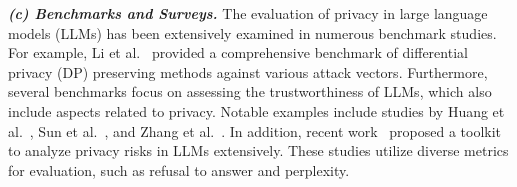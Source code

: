 \textbf{\textit{(c) Benchmarks and Surveys.}} The evaluation of privacy in large language models (LLMs) has been extensively examined in numerous benchmark studies. For example, Li et al.~\cite{Li2023PrivLMBenchAM} provided a comprehensive benchmark of differential privacy (DP) preserving methods against various attack vectors. Furthermore, several benchmarks focus on assessing the trustworthiness of LLMs, which also include aspects related to privacy. Notable examples include studies by Huang et al.~\cite{huang2024position}, Sun et al.~\cite{Sun2024TrustLLMTI}, and Zhang et al.~\cite{zhang2024benchmarkingtrustworthinessmultimodallarge}. In addition, recent work~\cite{Li2024LLMPBEAD} proposed a toolkit to analyze privacy risks in LLMs extensively. These studies utilize diverse metrics for evaluation, such as refusal to answer and perplexity.






